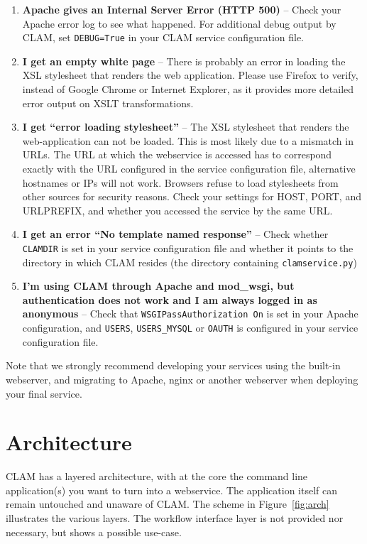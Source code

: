 \documentclass[a4paper,12pt,twoside,openright]{report}
\begin{document}
\begin{enumerate}[leftmargin=5mm]
\item \textbf{Apache gives an Internal Server Error (HTTP 500)} -- Check your Apache error log to see what happened. For additional debug output by CLAM, set \texttt{DEBUG=True} in your CLAM service configuration file. 
\item \textbf{I get an empty white page} -- There is probably an error in loading the XSL stylesheet that renders the web application. Please use Firefox to verify, instead of Google Chrome or Internet Explorer, as it provides more detailed error output on XSLT transformations.
\item \textbf{I get ``error loading stylesheet''} -- The XSL stylesheet that
  renders the web-application can not be loaded. This is most likely due to a
  mismatch in URLs. The URL at which the webservice is accessed has to
  correspond exactly with the URL configured in the service configuration file,
  alternative hostnames or IPs will not work. Browsers refuse to load
  stylesheets from other sources for security reasons. Check your settings for HOST, PORT,  and URLPREFIX, and whether you accessed the service by the same URL.
\item \textbf{I get an error ``No template named response''} -- Check whether
  \texttt{CLAMDIR} is set in your service configuration file and whether it points to the directory in which CLAM resides (the directory containing \texttt{clamservice.py})
\item \textbf{I'm using CLAM through Apache and mod_wsgi, but authentication does
  not work and I am always logged in as anonymous} -- Check that
  \texttt{WSGIPassAuthorization On} is set in your Apache configuration, and
  \texttt{USERS}, \texttt{USERS\_MYSQL} or \texttt{OAUTH} is configured in your service configuration file.

\end{enumerate}

Note that we strongly recommend developing your services using the built-in
webserver, and migrating to Apache, nginx or another webserver when deploying
your final service.

\section{Architecture}

CLAM has a layered architecture, with at the core the command line
application(s) you want to turn into a webservice. The application itself can
remain untouched and unaware of CLAM. The scheme in Figure~\ref{fig:arch}
illustrates the various layers.  The workflow interface layer is not provided
nor necessary, but shows a possible use-case.
\end{document}
